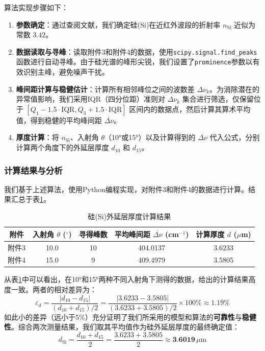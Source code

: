 \documentclass[withoutpreface,bwprint]{cumcmthesis} %
\begin{document}
算法实现步骤如下：
\begin{enumerate}
    \item \textbf{参数确定}：通过查阅文献\cite{Sun2022}，我们确定硅(Si)在近红外波段的折射率 $n_{\text{Si}}$ 近似为常数 $3.42$。
    \item \textbf{数据读取与寻峰}：读取附件3和附件4的数据，使用\texttt{scipy.signal.find\_peaks}函数进行自动寻峰。由于硅光谱的峰形尖锐，我们设置了\texttt{prominence}参数以有效识别主峰，避免噪声干扰。
    \item \textbf{峰间距计算与稳健估计}：计算所有相邻峰位之间的波数差 $\Delta\nu_k$。为消除潜在的异常值影响，我们采用IQR（四分位距）准则对 $\Delta\nu_k$ 集合进行筛选，仅保留位于 $[Q_1 - 1.5 \cdot \text{IQR}, Q_3 + 1.5 \cdot \text{IQR}]$ 区间内的数据点，然后计算其算术平均值，得到稳健的平均峰间距 $\overline{\Delta\nu}$。
    \item \textbf{厚度计算}：将 $n_{\text{Si}}$、入射角 $\theta$（10°或15°）以及计算得到的 $\overline{\Delta\nu}$ 代入公式，分别计算两个角度下的外延层厚度 $d_{10}$ 和 $d_{15}$。
\end{enumerate}

\subsubsection{计算结果与分析}

我们基于上述算法，使用Python编程实现，对附件3和附件4的数据进行计算。结果汇总于表\ref{tab:si_thickness_results}。

\begin{table}[htbp]
    \centering
    \caption{硅(Si)外延层厚度计算结果}
    \label{tab:si_thickness_results}
    \begin{tabular}{ccccc}
        \toprule
        附件  & 入射角 $\theta$ ($^\circ$) & 寻得峰数 & 平均峰间距 $\overline{\Delta\nu}$ (cm$^{-1}$) & 计算厚度 $d$ ($\mu$m) \\
        \midrule
        附件3 & 10.0                    & 10   & 404.0137                                 & 3.6233            \\
        附件4 & 15.0                    & 9    & 409.4979                                 & 3.5805            \\
        \bottomrule
    \end{tabular}
\end{table}

从表\ref{tab:si_thickness_results}中可以看出，在10°和15°两种不同入射角下测得的数据，给出的计算结果高度一致。两者的相对差异为：
$$
    \varepsilon_d = \frac{|d_{10} - d_{15}|}{(d_{10} + d_{15})/2} = \frac{|3.6233 - 3.5805|}{(3.6233 + 3.5805)/2} \times 100\% \approx 1.19\%
$$
如此小的差异（远小于5\%）充分证明了我们所采用的模型和算法的\textbf{可靠性}与\textbf{稳健性}。综合两次测量结果，我们取其平均值作为硅外延层厚度的最终确定值：
$$
    d_{\text{Si}} = \frac{d_{10} + d_{15}}{2} = \frac{3.6233 + 3.5805}{2} \approx \textbf{3.6019} \, \mu\text{m}
$$
\end{document}
